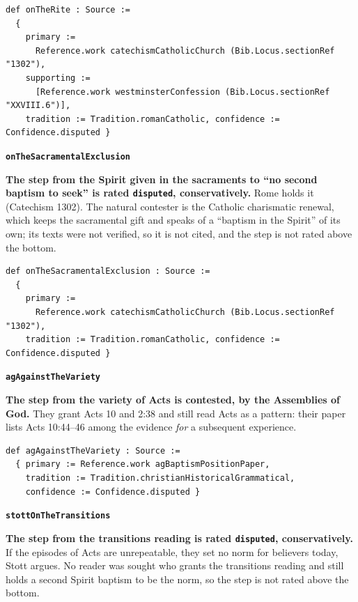 \documentclass[11pt]{article}
\begin{document}
{\small\begin{verbatim}
def onTheRite : Source :=
  {
    primary :=
      Reference.work catechismCatholicChurch (Bib.Locus.sectionRef "1302"),
    supporting :=
      [Reference.work westminsterConfession (Bib.Locus.sectionRef "XXVIII.6")],
    tradition := Tradition.romanCatholic, confidence := Confidence.disputed }
\end{verbatim}}
\par\medskip\noindent\textbf{\texttt{on\allowbreak{}The\allowbreak{}Sacramental\allowbreak{}Exclusion}}\par\nobreak\noindent
\textbf{The step from the Spirit given in the sacraments to “no second baptism to seek” is rated \texttt{disputed}, conservatively.} Rome holds it (Catechism 1302). The natural contester is the Catholic charismatic renewal, which keeps the sacramental gift and speaks of a “baptism in the Spirit” of its own; its texts were not verified, so it is not cited, and the step is not rated above the bottom.

{\small\begin{verbatim}
def onTheSacramentalExclusion : Source :=
  {
    primary :=
      Reference.work catechismCatholicChurch (Bib.Locus.sectionRef "1302"),
    tradition := Tradition.romanCatholic, confidence := Confidence.disputed }
\end{verbatim}}
\par\medskip\noindent\textbf{\texttt{ag\allowbreak{}Against\allowbreak{}The\allowbreak{}Variety}}\par\nobreak\noindent
\textbf{The step from the variety of Acts is contested, by the Assemblies of God.} They grant Acts 10 and 2:38 and still read Acts as a pattern: their paper lists Acts 10:44–46 among the evidence \emph{for} a subsequent experience.

{\small\begin{verbatim}
def agAgainstTheVariety : Source :=
  { primary := Reference.work agBaptismPositionPaper,
    tradition := Tradition.christianHistoricalGrammatical,
    confidence := Confidence.disputed }
\end{verbatim}}
\par\medskip\noindent\textbf{\texttt{stott\allowbreak{}On\allowbreak{}The\allowbreak{}Transitions}}\par\nobreak\noindent
\textbf{The step from the transitions reading is rated \texttt{disputed}, conservatively.} If the episodes of Acts are unrepeatable, they set no norm for believers today, Stott argues. No reader was sought who grants the transitions reading and still holds a second Spirit baptism to be the norm, so the step is not rated above the bottom.
\end{document}
